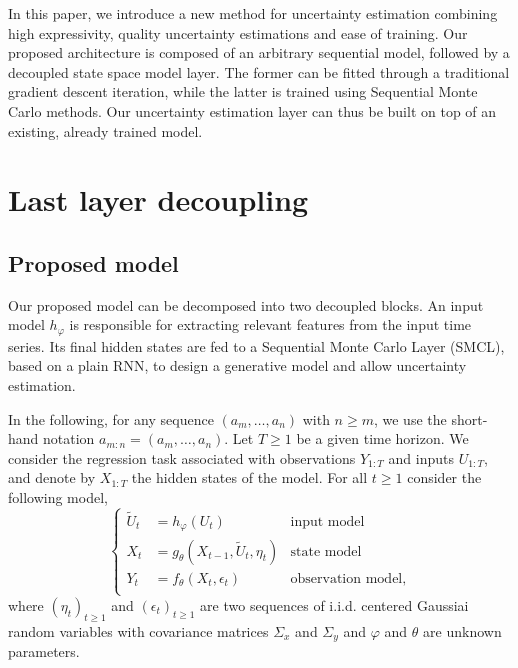 \documentclass{article}
\begin{document}
In this paper, we introduce a new method for uncertainty estimation combining high expressivity, quality uncertainty estimations and ease of training.
Our proposed architecture is composed of an arbitrary sequential model, followed by a decoupled state space model layer.
The former can be fitted through a traditional gradient descent iteration, while the latter is trained using Sequential Monte Carlo methods.
Our uncertainty estimation layer can thus be built on top of an existing, already trained model.

\section{Last layer decoupling}
\label{sec:decoupling}

\subsection{Proposed model}%
\label{sub:proposed_architecture}

Our proposed model can be decomposed into two decoupled blocks.
An input model $h_\varphi$ is responsible for extracting relevant features from the input time series.
Its final hidden states are fed to a Sequential Monte Carlo Layer (SMCL), based on a plain RNN, to design a generative model and allow uncertainty estimation.

In the following, for any sequence $(a_m,\ldots, a_n)$ with $n\geq m$, we use the short-hand notation $a_{m:n} = (a_m,\ldots, a_n)$. Let $T\ge 1$ be a given time horizon. We consider the regression task associated with observations $Y_{1:T}$ and inputs $U_{1:T}$, and denote by $X_{1:T}$ the hidden states of the model. For all $t\geq 1$ consider the following model,
\begin{equation*}
	\left\{
	\begin{aligned}
		\widetilde U_t & = h_\varphi(U_t)                        & \text{input model}       \\
		X_t        & = g_\theta(X_{t-1}, \widetilde U_t, \eta_t) & \text{state model}       \\
		Y_t        & = f_\theta(X_t, \epsilon_t)             & \text{observation model,} \\
	\end{aligned}
	\right.
\end{equation*}
where $(\eta_t)_{t\geq 1}$ and $(\epsilon_t)_{t\geq 1}$ are two sequences of i.i.d. centered Gaussiai random variables with covariance matrices $\Sigma_x$ and $\Sigma_y$ and $\varphi$ and $\theta$ are unknown parameters.
\end{document}
